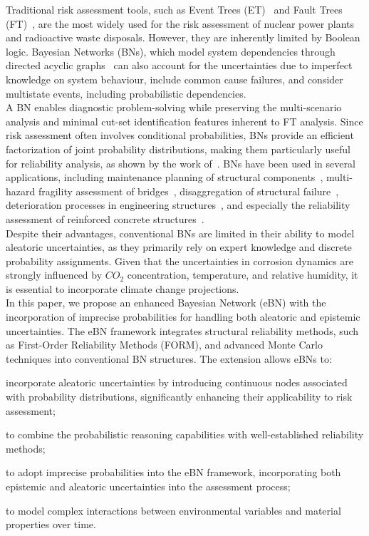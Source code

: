 Traditional risk assessment tools, such as Event Trees (ET)~\cite{papazoglou_mathematical_1998} and Fault Trees (FT)~\cite{kabir_overview_2017}, are the most widely used for the risk assessment of nuclear power plants and radioactive waste disposals.
However, they are inherently limited by Boolean logic.
Bayesian Networks (BNs), which model system dependencies through directed acyclic graphs~\cite{mahadevan2001bayesian} can also account for the uncertainties due to imperfect knowledge on system behaviour, include common cause failures, and consider multistate events, including probabilistic dependencies. \\
A BN enables diagnostic problem-solving while preserving the multi-scenario analysis and minimal cut-set identification features inherent to FT analysis.
Since risk assessment often involves conditional probabilities, BNs provide an efficient factorization of joint probability distributions, making them particularly useful for reliability analysis, as shown by the work of~\textcite{langseth_bayesian_2007}.
BNs have been used in several applications, including maintenance planning of structural components~\cite{morato2022optimal}, multi-hazard fragility assessment of bridges~\cite{gehl2016development, barros2024gaussian}, disaggregation of structural failure~\cite{yazdani2020bayesian}, deterioration processes in engineering structures~\cite{luque2019risk,lee2023dynamic,tran2020dynamic}, and especially the reliability assessment of reinforced concrete structures~\cite{hackl2016reliability,hosseini2024dynamic,guo2024mixed}.\\
Despite their advantages, conventional BNs are limited in their ability to model aleatoric uncertainties, as they primarily rely on expert knowledge and discrete probability assignments.
Given that the uncertainties in corrosion dynamics are strongly influenced by $CO_2$ concentration, temperature, and relative humidity, it is essential to incorporate climate change projections.\\
In this paper, we propose an enhanced Bayesian Network (eBN) with the incorporation of imprecise probabilities for handling both aleatoric and epistemic uncertainties.
The eBN framework integrates structural reliability methods, such as First-Order Reliability Methods (FORM), and advanced Monte Carlo techniques into conventional BN structures. 
The extension allows eBNs to: 
\begin{enumerate*}[label=\roman*)]
  \item incorporate aleatoric uncertainties by introducing continuous nodes associated with probability distributions, significantly enhancing their applicability to risk assessment;
  \item to combine the probabilistic reasoning capabilities with well-established reliability methods;
  \item to adopt imprecise probabilities into the eBN framework, incorporating both epistemic and aleatoric uncertainties into the assessment process;
  \item to model complex interactions between environmental variables and material properties over time.
\end{enumerate*} 
